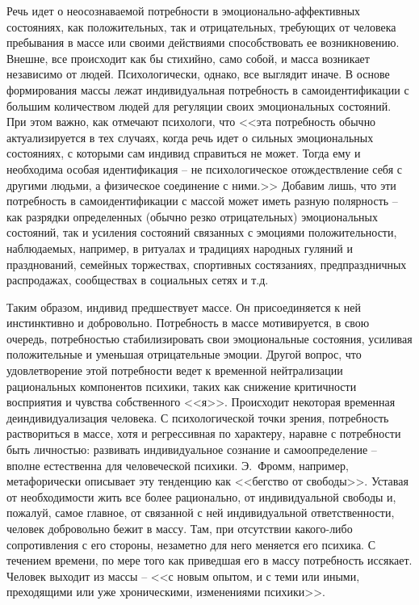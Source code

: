 Речь идет о неосознаваемой потребности в эмоционально-аффективных состояниях, как положительных,
так и отрицательных, требующих от человека пребывания в массе или своими действиями способствовать ее возникновению.
Внешне, все происходит как бы стихийно, само собой, и масса возникает независимо от людей. Психологически, однако, все выглядит иначе. В основе формирования массы лежат индивидуальная потребность в
самоидентификации с большим количеством людей для регуляции своих эмоциональных состояний. При этом важно, как
отмечают психологи, что <<эта потребность обычно актуализируется в тех случаях, когда речь идет о сильных
эмоциональных состояниях, с которыми сам индивид справиться не может. Тогда ему и необходима особая идентификация --
не психологическое отождествление себя с другими людьми, а физическое соединение с ними.>>\autocite{olshansky} Добавим лишь,
что эти потребность в самоидентификации с массой может иметь разную полярность -- как разрядки определенных
(обычно резко отрицательных) эмоциональных состояний, так и усиления состояний связанных с эмоциями положительности,
наблюдаемых, например, в ритуалах и традициях народных гуляний и празднований, семейных торжествах, спортивных
состязаниях, предпраздничных распродажах, сообществах в социальных сетях и т.д.

Таким образом, индивид предшествует массе. Он присоединяется к ней инстинктивно и добровольно.
Потребность в массе мотивируется, в свою очередь, потребностью стабилизировать свои эмоциональные состояния,
усиливая положительные и уменьшая отрицательные эмоции. Другой вопрос, что удовлетворение этой потребности
ведет к временной нейтрализации рациональных компонентов психики, таких как снижение критичности восприятия
и чувства собственного <<я>>. Происходит некоторая временная деиндивидуализация человека. С психологической
точки зрения, потребность раствориться в массе, хотя и регрессивная по характеру, наравне с потребности
быть личностью: развивать индивидуальное сознание и самоопределение -- вполне естественна для человеческой психики.
Э.~Фромм, например, метафорически описывает эту тенденцию как <<бегство от свободы>>. Уставая от необходимости жить
все более рационально, от индивидуальной свободы и, пожалуй, самое главное, от связанной с ней
индивидуальной ответственности, человек добровольно бежит в массу.\autocite{fromm} Там, при отсутствии какого-либо
сопротивления с его стороны, незаметно для него меняется его психика. С течением времени, по мере того
как приведшая его в массу потребность иссякает. Человек выходит из массы -- <<с новым опытом, и с теми
или иными, преходящими или уже хроническими, изменениями психики>>.\autocite{olshansky}

